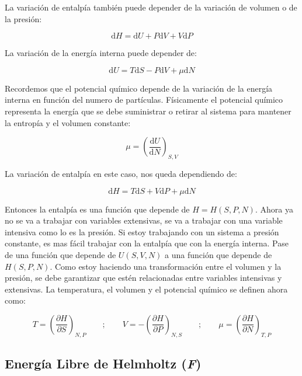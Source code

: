 \documentclass[11pt,fleqn]{book}
\begin{document}
La variación de entalpía  también puede depender de la variación de volumen o de la presión:

\begin{equation*}
   \mathrm{d}H=\mathrm{d}U+P\mathrm{d}V+V\mathrm{d}P 
\end{equation*}


La variación de la energía interna puede depender de:

\begin{equation*}
    \mathrm{d}U=T\mathrm{d}S-P\mathrm{d}V+\mu\mathrm{d}N
\end{equation*}

Recordemos que el potencial químico depende de la variación de la energía interna en función del numero de partículas. Físicamente el potencial químico representa la energía que se debe suministrar o retirar al sistema para mantener la entropía y el volumen constante:

\begin{equation}
    \mu= \left(\frac{\mathrm{d}U}{\mathrm{d}N}\right)_{S,V}
    \label{Eq. 4.54}
\end{equation}

La variación de entalpía en este caso, nos queda dependiendo de:

\begin{equation}
\mathrm{d}H=T\mathrm{d}S+V\mathrm{d}P+\mu\mathrm{d}N
    \label{Eq. 4.55}
\end{equation}

Entonces la entalpía es una función que depende de $H=H(S, P, N)$. Ahora  ya no se va a trabajar con variables extensivas, se va a trabajar con una variable intensiva como lo es la presión. Si estoy trabajando con un sistema a presión constante, es mas fácil trabajar con la entalpía que con la energía interna. Pase de una función que depende de $U(S, V, N)$ a una función que depende de $H(S, P, N)$. Como estoy haciendo una transformación entre el volumen y la presión, se debe garantizar que estén relacionadas entre variables intensivas y extensivas. La temperatura, el volumen y el potencial químico se definen ahora como:

\begin{equation}
        T=\left(\frac{\partial H}{\partial S}\right)_{N,P}\qquad;\qquad V=-\left(\frac{\partial H}{\partial P}\right)_{N,S}\qquad;\qquad \mu=\left(\frac{\partial H}{\partial N}\right)_{T,P}
    \label{Eq. 4.55a}
\end{equation}

\subsection{Energía Libre de Helmholtz (\textit{F})}
\end{document}
